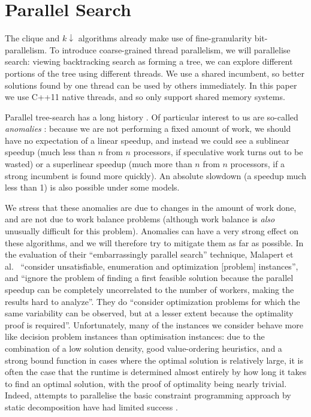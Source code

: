 \documentclass{llncs}
\begin{document}
\section{Parallel Search}

The clique and $k{\downarrow}$ algorithms already make use of fine-granularity bit-parallelism. To
introduce coarse-grained thread parallelism, we will parallelise search: viewing backtracking search
as forming a tree, we can explore different portions of the tree using different threads. We use a
shared incumbent, so better solutions found by one thread can be used by others immediately. In this
paper we use C++11 native threads, and so only support shared memory systems.

Parallel tree-search has a long history \cite{o:BaderHC05}. Of particular interest to us are
so-called \emph{anomalies}
\cite{DBLP:journals/cacm/LaiS84,DBLP:journals/tc/LiW86,DBLP:conf/irregular/BruinKT95}: because we
are not performing a fixed amount of work, we should have no expectation of a linear speedup, and
instead we could see a sublinear speedup (much less than $n$ from $n$ processors, if speculative
work turns out to be wasted) or a superlinear speedup (much more than $n$ from $n$ processors, if a
strong incumbent is found more quickly). An absolute slowdown (a speedup much less than 1) is also
possible under some models.

We stress that these anomalies are due to changes in the amount of work done, and are not due to
work balance problems (although work balance is \emph{also} unusually difficult for this problem).
Anomalies can have a very strong effect on these algorithms, and we will therefore try to mitigate
them as far as possible. In the evaluation of their ``embarrassingly parallel search'' technique,
Malapert et al.\ \cite{DBLP:journals/jair/MalapertRR16} ``consider unsatisfiable, enumeration and
optimization [problem] instances'', and ``ignore the problem of finding a first feasible solution
because the parallel speedup can be completely uncorrelated to the number of workers, making the
results hard to analyze''. They do ``consider optimization problems for which the same variability
can be observed, but at a lesser extent because the optimality proof is required''. Unfortunately,
many of the instances we consider behave more like decision problem instances than optimisation
instances: due to the combination of a low solution density, good value-ordering heuristics, and a
strong bound function in cases where the optimal solution is relatively large, it is often the case
that the runtime is determined almost entirely by how long it takes to find an optimal solution,
with the proof of optimality being nearly trivial.  Indeed, attempts to parallelise the basic
constraint programming approach by static decomposition have had limited success
\cite{DBLP:conf/ictai/MinotNS15}.
\end{document}
